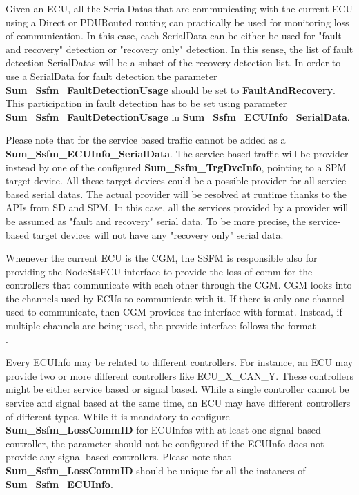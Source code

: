 Given an ECU, all the SerialDatas that are communicating with the current ECU using a Direct or PDURouted routing can practically be used for monitoring loss of communication. 
In this case, each SerialData can be either be used for "fault and recovery" detection or "recovery only" detection.
In this sense, the list of fault detection SerialDatas will be a subset of the recovery detection list.
In order to use a SerialData for fault detection the parameter \textbf{Sum\_Ssfm\_FaultDetectionUsage} should be set to \textbf{FaultAndRecovery}.
This participation in fault detection has to be set using parameter \textbf{Sum\_Ssfm\_FaultDetectionUsage} in \textbf{Sum\_Ssfm\_ECUInfo\_SerialData}.

Please note that for the service based traffic cannot be added as a \textbf{Sum\_Ssfm\_ECUInfo\_SerialData}. The service based traffic will be provider instead by 
one of the configured \textbf{Sum\_Ssfm\_TrgDvcInfo}, pointing to a SPM target device. All these target devices could be a possible provider for all service-based serial datas.
The actual provider will be resolved at runtime thanks to the APIs from SD and SPM. In this case, all the services provided by a provider will be assumed as "fault and recovery" serial data.
To be more precise, the service-based target devices will not have any "recovery only" serial data.  

Whenever the current ECU is the CGM, the SSFM is responsible also for providing the NodeStsECU interface to provide the loss of comm for the controllers that communicate with each other through the CGM.
CGM looks into the channels used by ECUs to communicate with it. If there is only one channel used to communicate, then CGM provides the interface with  format. 
Instead, if multiple channels are being used, the provide interface follows the format \\ . 

Every ECUInfo may be related to different controllers. For instance, an ECU may provide two or more different controllers like ECU\_X\_CAN\_Y.
These controllers might be either service based or signal based. While a single controller cannot be service and signal based at the same time,
an ECU may have different controllers of different types. 
While it is mandatory to configure \textbf{Sum\_Ssfm\_LossCommID} for ECUInfos with at least one signal based controller,
the parameter should not be configured if the ECUInfo does not provide any signal based controllers.
Please note that \textbf{Sum\_Ssfm\_LossCommID} should be unique for all the instances of \\ \textbf{Sum\_Ssfm\_ECUInfo}.

